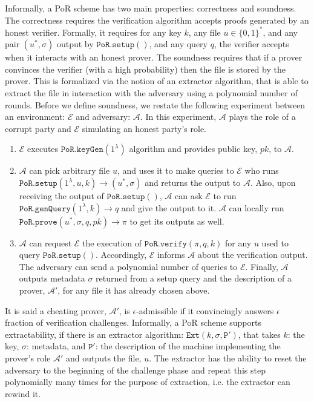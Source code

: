 Informally, a PoR scheme has two main properties: correctness and soundness. The correctness requires  the verification algorithm accepts  proofs generated by an honest verifier. Formally, it requires  for any key $k$, any file $u\in\{0,1\}^{\scriptscriptstyle *}$, and any  pair $(u^{*},\sigma)$ output by $\mathtt{PoR.setup}()$, and any query $q$, the verifier  accepts when it interacts with an honest prover. The soundness requires that if  a prover convinces the verifier (with a high probability) then the file is  stored by the prover. This is formalized via the notion of an extractor algorithm, that is able to extract the file in interaction with the adversary using a polynomial number of  rounds. Before we define  soundness, we restate the following  experiment between an environment: $\mathcal{E}$ and  adversary: $\mathcal{A}$. In this experiment, $\mathcal{A}$ plays the role of a corrupt party and $\mathcal{E}$ simulating an honest party's role. 


\begin{enumerate}
\item $\mathcal{E}$ executes $\mathtt{PoR.keyGen}(1^{\scriptscriptstyle\lambda})$ algorithm and provides public key, $pk$, to $\mathcal{A}$.   
\item $\mathcal{A}$ can pick  arbitrary file $u$, and  uses it to make queries to  $\mathcal{E}$ who runs  $\mathtt{PoR.setup}(1^{\scriptscriptstyle\lambda}, u,k)\rightarrow (u^{\scriptscriptstyle *}, \sigma)$   and returns the output to $\mathcal{A}$. Also, upon receiving the output of $\mathtt{PoR.setup}()$, $\mathcal{A}$ can ask $\mathcal{E}$  to run   $\mathtt{PoR.genQuery}(1^{\scriptscriptstyle\lambda},k)\rightarrow q$ and give the output to it. $\mathcal{A}$ can locally run $\mathtt{PoR.prove}(u^{\scriptscriptstyle *}, \sigma,q,pk)\rightarrow \pi$ to get its outputs as well. 
\item $\mathcal{A}$ can request $\mathcal{E}$ the execution of $\mathtt{PoR.verify}(\pi,q,k)$ for any $u$ used to query $\mathtt{PoR.setup}()$. Accordingly, $\mathcal{E}$ informs  $\mathcal{A}$ about the verification output. The adversary can send a polynomial number of queries to $\mathcal{E}$. Finally, $\mathcal{A}$ outputs metadata $\sigma$ returned from a setup query and the description of a prover, $\mathcal{A}'$, for any file it has already chosen above. 
\end{enumerate}

It is said a cheating prover, $\mathcal{A}'$, is $\epsilon$-admissible if it convincingly answers $\epsilon$ fraction of verification challenges. Informally, a PoR scheme supports extractability, if there is an extractor algorithm: $\mathtt{Ext}(k,\sigma, \mathtt{P}')$, that takes $k$: the key, $\sigma$: metadata, and $\mathtt{P}'$: the description of the  machine implementing the prover's role $\mathcal{A}'$ and outputs the file, $u$. The extractor has the ability to reset the adversary to the beginning of the challenge phase and repeat this step polynomially many times for the purpose of extraction, i.e. the extractor can rewind it.


